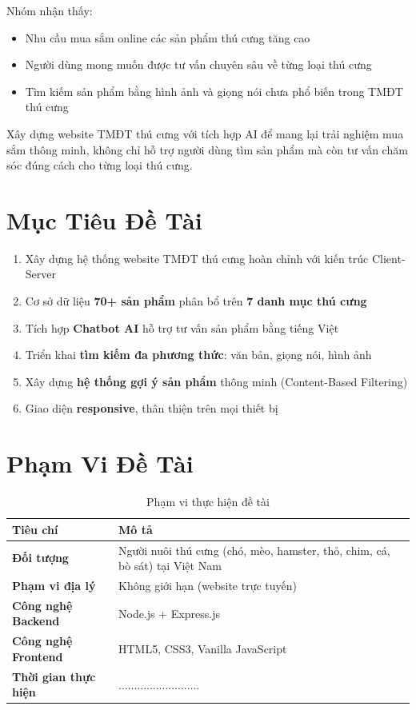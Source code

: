 \documentclass[12pt, a4paper]{report}
\begin{document}
Nhóm nhận thấy:
\begin{itemize}[leftmargin=*]
    \item Nhu cầu mua sắm online các sản phẩm thú cưng tăng cao
    \item Người dùng mong muốn được tư vấn chuyên sâu về từng loại thú cưng
    \item Tìm kiếm sản phẩm bằng hình ảnh và giọng nói chưa phổ biến trong TMĐT thú cưng
\end{itemize}

\begin{infobox}
Xây dựng website TMĐT thú cưng với tích hợp AI để mang lại trải nghiệm mua sắm thông minh, không chỉ hỗ trợ người dùng tìm sản phẩm mà còn tư vấn chăm sóc đúng cách cho từng loại thú cưng.
\end{infobox}

\section{Mục Tiêu Đề Tài}

\begin{enumerate}[leftmargin=*, label=\textbf{\arabic*.}]
    \item Xây dựng hệ thống website TMĐT thú cưng hoàn chỉnh với kiến trúc Client-Server
    \item Cơ sở dữ liệu \textbf{70+ sản phẩm} phân bổ trên \textbf{7 danh mục thú cưng}
    \item Tích hợp \textbf{Chatbot AI} hỗ trợ tư vấn sản phẩm bằng tiếng Việt
    \item Triển khai \textbf{tìm kiếm đa phương thức}: văn bản, giọng nói, hình ảnh
    \item Xây dựng \textbf{hệ thống gợi ý sản phẩm} thông minh (Content-Based Filtering)
    \item Giao diện \textbf{responsive}, thân thiện trên mọi thiết bị
\end{enumerate}

\section{Phạm Vi Đề Tài}

\begin{table}[H]
    \centering
    \caption{Phạm vi thực hiện đề tài}
    \begin{tabular}{>{\bfseries}p{4cm}p{9cm}}
        \toprule
        Tiêu chí & Mô tả \\
        \midrule
        Đối tượng & Người nuôi thú cưng (chó, mèo, hamster, thỏ, chim, cá, bò sát) tại Việt Nam \\
        Phạm vi địa lý & Không giới hạn (website trực tuyến) \\
        Công nghệ Backend & Node.js + Express.js \\
        Công nghệ Frontend & HTML5, CSS3, Vanilla JavaScript \\
        Thời gian thực hiện & .......................... \\
        \bottomrule
    \end{tabular}
\end{table}
\end{document}
